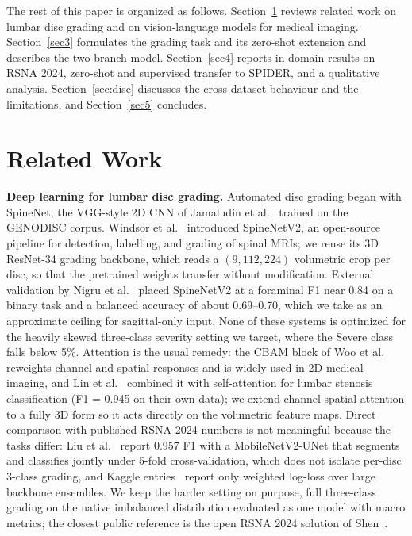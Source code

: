 \documentclass[runningheads]{llncs}
\begin{document}
The rest of this paper is organized as follows. Section~\ref{sec2} reviews related work on lumbar disc grading and on vision-language models for medical imaging. Section~\ref{sec3} formulates the grading task and its zero-shot extension and describes the two-branch model. Section~\ref{sec4} reports in-domain results on RSNA 2024, zero-shot and supervised transfer to SPIDER, and a qualitative analysis. Section~\ref{sec:disc} discusses the cross-dataset behaviour and the limitations, and Section~\ref{sec5} concludes.

\section{Related Work}\label{sec2}

\textbf{Deep learning for lumbar disc grading.}
Automated disc grading began with SpineNet, the VGG-style 2D CNN of Jamaludin et al.~\cite{jamaludin2017} trained on the GENODISC corpus. Windsor et al.~\cite{windsor2022} introduced SpineNetV2, an open-source pipeline for detection, labelling, and grading of spinal MRIs; we reuse its 3D ResNet-34 grading backbone, which reads a $(9, 112, 224)$ volumetric crop per disc, so that the pretrained weights transfer without modification. External validation by Nigru et al.~\cite{nigru2024} placed SpineNetV2 at a foraminal F1 near 0.84 on a binary task and a balanced accuracy of about 0.69--0.70, which we take as an approximate ceiling for sagittal-only input. None of these systems is optimized for the heavily skewed three-class severity setting we target, where the Severe class falls below 5\%. Attention is the usual remedy: the CBAM block of Woo et al.~\cite{woo2018cbam} reweights channel and spatial responses and is widely used in 2D medical imaging, and Lin et al.~\cite{lin2024cbam} combined it with self-attention for lumbar stenosis classification (F1 = 0.945 on their own data); we extend channel-spatial attention to a fully 3D form so it acts directly on the volumetric feature maps. Direct comparison with published RSNA 2024 \cite{kaggle2024} numbers is not meaningful because the tasks differ: Liu et al.~\cite{aktan2025} report 0.957 F1 with a MobileNetV2-UNet that segments and classifies jointly under 5-fold cross-validation, which does not isolate per-disc 3-class grading, and Kaggle entries~\cite{kaggle2024} report only weighted log-loss over large backbone ensembles. We keep the harder setting on purpose, full three-class grading on the native imbalanced distribution evaluated as one model with macro metrics; the closest public reference is the open RSNA 2024 solution of Shen~\cite{nshen2024}.
\end{document}

